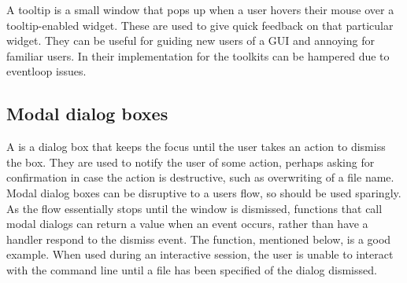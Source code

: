 A tooltip is a small window that pops up when a user hovers their mouse
over a tooltip-enabled widget. These are used to give quick feedback
on that particular widget. They can be useful for guiding new users of
a GUI and  annoying for familiar users. In \R\/ their implementation
for the toolkits can be hampered due to eventloop issues.










\subsection{Modal dialog boxes}
\label{sec:GUI:modal-dialogs}

A  is a dialog box that keeps the focus until
the user takes an action to dismiss the box. They are used to notify
the user of some action, perhaps asking for confirmation in case the
action is destructive, such as overwriting of a file name. Modal
dialog boxes can be disruptive to a users flow, so should be used
sparingly. As the flow essentially stops until the window is
dismissed, functions that call modal dialogs can return a value when
an event occurs, rather than have a handler respond to the dismiss
event. The  function, mentioned below, is a good
example. When used during an interactive \R\/ session, the user is
unable to interact with the command line until a file has been
specified of the dialog dismissed. 


